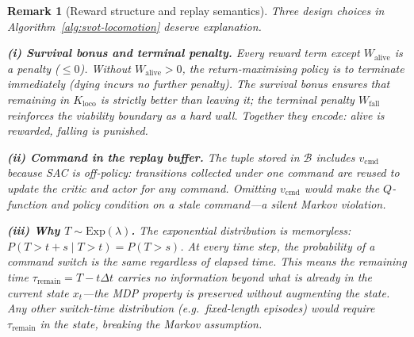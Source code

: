 \documentclass[11pt,a4paper]{article}
\newtheorem{remark}[theorem]{Remark}
\newcommand{\cB}{\mathcal{B}}
\begin{document}
\begin{remark}[Reward structure and replay semantics]
\label{rem:reward-structure}
Three design choices in
Algorithm~\ref{alg:svot-locomotion}
deserve explanation.

\medskip\noindent
\textbf{(i) Survival bonus and terminal penalty.}\;
Every reward term except $W_{\mathrm{alive}}$
is a penalty ($\leq 0$).
Without $W_{\mathrm{alive}} > 0$,
the return-maximising policy is to terminate
immediately (dying incurs no further penalty).
The survival bonus ensures that
remaining in $K_{\mathrm{loco}}$
is strictly better than leaving it;
the terminal penalty $W_{\mathrm{fall}}$
reinforces the viability boundary as a hard wall.
Together they encode:
\emph{alive is rewarded, falling is punished}.

\medskip\noindent
\textbf{(ii) Command in the replay buffer.}\;
The tuple stored in $\cB$ includes
$v_{\mathrm{cmd}}$
because SAC is off-policy:
transitions collected under one command
are reused to update the critic and actor
for any command.
Omitting $v_{\mathrm{cmd}}$ would make
the $Q$-function and policy condition on a
stale command---a silent Markov violation.

\medskip\noindent
\textbf{(iii) Why $T \sim \mathrm{Exp}(\lambda)$.}\;
The exponential distribution is
\emph{memoryless}:
$P(T > t{+}s \mid T > t) = P(T > s)$.
At every time step, the probability of a
command switch is the same regardless of
elapsed time.
This means the remaining time
$\tau_{\mathrm{remain}} = T - t\Delta t$
carries no information beyond what is already
in the current state $x_t$---the
MDP property is preserved without
augmenting the state.
Any other switch-time distribution
(e.g.\ fixed-length episodes)
would require $\tau_{\mathrm{remain}}$ in the state,
breaking the Markov assumption.
\end{remark}
\end{document}
